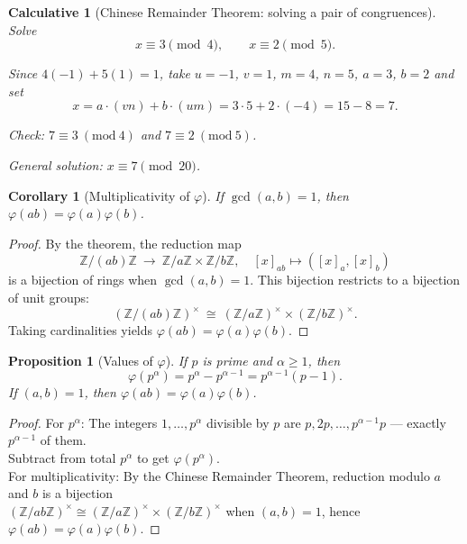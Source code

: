 \documentclass[12pt]{article}
\newtheorem{proposition}[theorem]{Proposition}
\newtheorem{corollary}[theorem]{Corollary}
\newtheorem{calculative}[theorem]{Calculative}
\theoremstyle{definition}
\begin{document}
\dotfill

\begin{calculative}[Chinese Remainder Theorem: solving a pair of congruences]

\noindent
Solve
\[
x\equiv 3 \pmod{4},\qquad x\equiv 2 \pmod{5}.
\]

\noindent
Since $4(-1)+5(1)=1$, take $u=-1$, $v=1$, $m=4$, $n=5$, $a=3$, $b=2$ and set
\[
x=a\cdot (v n)+b\cdot (u m)=3\cdot 5+2\cdot (-4)=15-8=7.
\]

\noindent
Check: $7\equiv 3\ (\mathrm{mod}\ 4)$ and $7\equiv 2\ (\mathrm{mod}\ 5)$.  

\noindent
General solution: $x\equiv 7\pmod{20}$.
\end{calculative}


\dotfill

\begin{corollary}[Multiplicativity of $\varphi$]
If $\gcd(a,b)=1$, then $\varphi(ab) = \varphi(a)\varphi(b)$.
\end{corollary}

\vspace{1em}

\begin{proof}
By the theorem, the reduction map
\[
\mathbb{Z}/(ab)\mathbb{Z} \ \longrightarrow\ \mathbb{Z}/a\mathbb{Z} \times \mathbb{Z}/b\mathbb{Z},
\quad [x]_{ab} \mapsto ([x]_a,[x]_b)
\]
is a bijection of rings when $\gcd(a,b)=1$. This bijection restricts to a bijection of unit groups:
\[
(\mathbb{Z}/(ab)\mathbb{Z})^\times \ \cong\ (\mathbb{Z}/a\mathbb{Z})^\times \times (\mathbb{Z}/b\mathbb{Z})^\times.
\]
Taking cardinalities yields $\varphi(ab) = \varphi(a)\varphi(b)$.
\end{proof}


\dotfill

\begin{proposition}[Values of $\varphi$]
If $p$ is prime and $\alpha\ge 1$, then
\[
\varphi(p^\alpha) = p^\alpha - p^{\alpha-1} = p^{\alpha-1}(p-1).
\]
If $(a,b)=1$, then $\varphi(ab) = \varphi(a)\varphi(b)$.
\end{proposition}

\vspace{1em}

\begin{proof}
For $p^\alpha$: The integers $1,\dots,p^\alpha$ divisible by $p$ are $p,2p,\dots, p^{\alpha-1}p$ — exactly $p^{\alpha-1}$ of them. \\

\noindent
Subtract from total $p^\alpha$ to get $\varphi(p^\alpha)$.\\

\noindent
For multiplicativity: By the Chinese Remainder Theorem, reduction modulo $a$ and $b$ is a bijection \\

$(\mathbb{Z}/ab\mathbb{Z})^\times \cong (\mathbb{Z}/a\mathbb{Z})^\times\times (\mathbb{Z}/b\mathbb{Z})^\times$ when $(a,b)=1$, hence $\varphi(ab) = \varphi(a)\varphi(b)$.

\end{proof}
\end{document}
